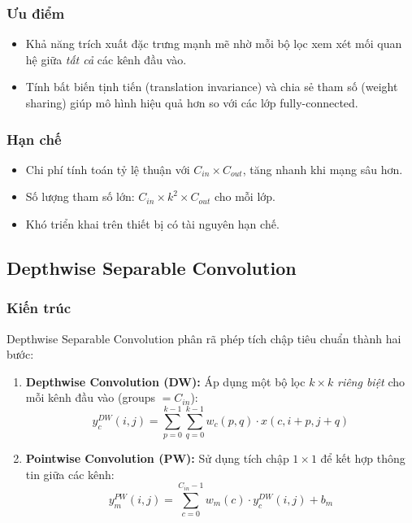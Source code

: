 \subsubsection*{Ưu điểm}
\begin{itemize}
    \item Khả năng trích xuất đặc trưng mạnh mẽ nhờ mỗi bộ lọc xem xét mối quan hệ giữa \textit{tất cả} các kênh đầu vào.
    \item Tính bất biến tịnh tiến (translation invariance) và chia sẻ tham số (weight sharing) giúp mô hình hiệu quả hơn so với các lớp fully-connected.
\end{itemize}

\subsubsection*{Hạn chế}
\begin{itemize}
    \item Chi phí tính toán tỷ lệ thuận với $C_{in} \times C_{out}$, tăng nhanh khi mạng sâu hơn.
    \item Số lượng tham số lớn: $C_{in} \times k^2 \times C_{out}$ cho mỗi lớp.
    \item Khó triển khai trên thiết bị có tài nguyên hạn chế.
\end{itemize}

\subsection{Depthwise Separable Convolution}
\label{subsec:depthwise}

\subsubsection*{Kiến trúc}

Depthwise Separable Convolution \cite{depthwise2017} phân rã phép tích chập tiêu chuẩn thành hai bước:

\begin{enumerate}
    \item \textbf{Depthwise Convolution (DW):} Áp dụng một bộ lọc $k \times k$ \textit{riêng biệt} cho mỗi kênh đầu vào (groups $= C_{in}$):
    \begin{equation}
        y_c^{DW}(i, j) = \sum_{p=0}^{k-1} \sum_{q=0}^{k-1} w_c(p, q) \cdot x(c, i+p, j+q)
    \end{equation}
    
    \item \textbf{Pointwise Convolution (PW):} Sử dụng tích chập $1 \times 1$ để kết hợp thông tin giữa các kênh:
    \begin{equation}
        y_m^{PW}(i, j) = \sum_{c=0}^{C_{in}-1} w_m(c) \cdot y_c^{DW}(i, j) + b_m
    \end{equation}
\end{enumerate}

